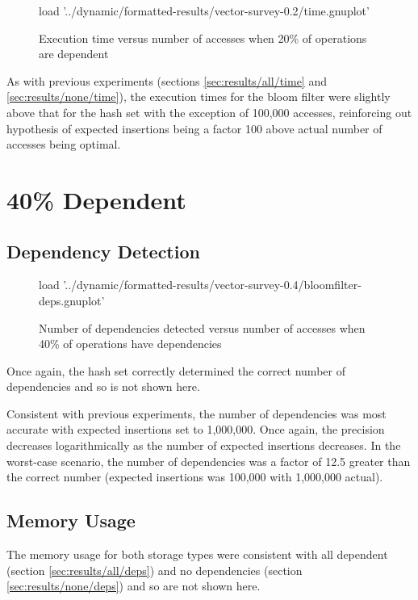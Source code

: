 	\begin{figure}
		\centering
		\begin{gnuplot}[terminal=pdf]
			load '../dynamic/formatted-results/vector-survey-0.2/time.gnuplot'
		\end{gnuplot}
		\caption{Execution time versus number of accesses when 20\% of operations are dependent}
		\label{chart:20-time}
	\end{figure}
	
	As with previous experiments (sections \ref{sec:results/all/time} and \ref{sec:results/none/time}), the execution times for the bloom filter were slightly above that for the hash set with the exception of 100,000 accesses, reinforcing out hypothesis of expected insertions being a factor 100 above actual number of accesses being optimal.

\section{40\% Dependent} \label{sec:results/40}
	\subsection{Dependency Detection} \label{sec:results/40/deps}
	\begin{figure}
		\centering
		\begin{gnuplot}[terminal=pdf]
		load  '../dynamic/formatted-results/vector-survey-0.4/bloomfilter-deps.gnuplot'
		\end{gnuplot}
		\caption{Number of dependencies detected versus number of accesses when 40\% of operations have dependencies}
		\label{chart:40-dep}
	\end{figure}
	
	Once again, the hash set correctly determined the correct number of dependencies and so is not shown here.
		
	Consistent with previous experiments, the number of dependencies was most accurate with expected insertions set to 1,000,000. Once again, the precision decreases logarithmically as the number of expected insertions decreases. In the worst-case scenario, the number of dependencies was a factor of 12.5 greater than the correct number (expected insertions was 100,000 with 1,000,000 actual).
	
	\subsection{Memory Usage} \label{sec:results/40/mem}
	The memory usage for both storage types were consistent with all dependent (section \ref{sec:results/all/deps}) and no dependencies (section \ref{sec:results/none/deps}) and so are not shown here.
	
